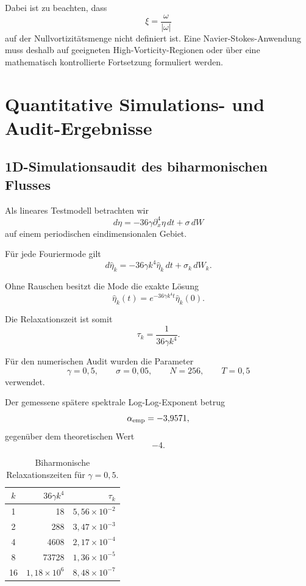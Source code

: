 \documentclass[11pt,twoside,a4paper]{article}
\begin{document}
	Dabei ist zu beachten, dass
	\[
	\xi
	=
	\frac{\omega}{|\omega|}
	\]
	auf der Nullvortizitätsmenge nicht definiert ist. Eine Navier-Stokes-Anwendung muss deshalb auf geeigneten High-Vorticity-Regionen oder über eine mathematisch kontrollierte Fortsetzung formuliert werden.
	
	\section{Quantitative Simulations- und Audit-Ergebnisse}
	
	\subsection{1D-Simulationsaudit des biharmonischen Flusses}
	
	Als lineares Testmodell betrachten wir
	\begin{equation}
		d\eta
		=
		-36\gamma
		\partial_x^4\eta
		\,dt
		+
		\sigma\,dW
	\end{equation}
	auf einem periodischen eindimensionalen Gebiet.
	
	Für jede Fouriermode gilt
	\begin{equation}
		d\widehat{\eta}_k
		=
		-36\gamma k^4
		\widehat{\eta}_k
		\,dt
		+
		\sigma_k\,dW_k.
	\end{equation}
	
	Ohne Rauschen besitzt die Mode die exakte Lösung
	\begin{equation}
		\widehat{\eta}_k(t)
		=
		e^{-36\gamma k^4t}
		\widehat{\eta}_k(0).
	\end{equation}
	
	Die Relaxationszeit ist somit
	\begin{equation}
		\boxed{
			\tau_k
			=
			\frac{1}{36\gamma k^4}.
		}
	\end{equation}
	
	Für den numerischen Audit wurden die Parameter
	\[
	\gamma=0{,}5,
	\qquad
	\sigma=0{,}05,
	\qquad
	N=256,
	\qquad
	T=0{,}5
	\]
	verwendet.
	
	Der gemessene spätere spektrale Log-Log-Exponent betrug
	\begin{equation}
		\alpha_{\rm emp}
		=
		-3{,}9571,
	\end{equation}
	gegenüber dem theoretischen Wert
	\[
	-4.
	\]
	
	\begin{table}[htbp]
		\centering
		\caption{Biharmonische Relaxationszeiten für $\gamma=0{,}5$.}
		\label{tab:relaxation_times}
		\begin{tabular}{crr}
			\toprule
			$k$ &
			$36\gamma k^4$ &
			$\tau_k$
			\\
			\midrule
			1  & 18 & $5{,}56\times10^{-2}$ \\
			2  & 288 & $3{,}47\times10^{-3}$ \\
			4  & 4608 & $2{,}17\times10^{-4}$ \\
			8  & 73728 & $1{,}36\times10^{-5}$ \\
			16 & $1{,}18\times10^6$ & $8{,}48\times10^{-7}$ \\
			\bottomrule
		\end{tabular}
	\end{table}
	
\end{document}
